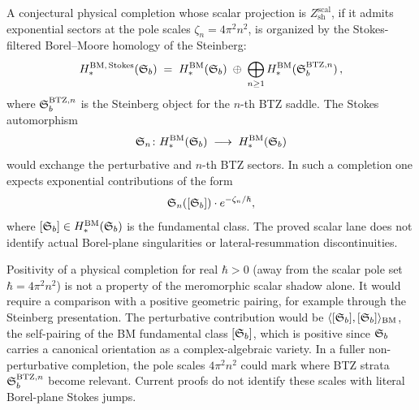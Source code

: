 \begin{conjecture}
A conjectural physical completion whose scalar projection is
$Z_{\mathrm{sh}}^{\mathrm{scal}}$, if it admits exponential sectors at
the pole scales $\zeta_n = 4\pi^2 n^2$, is organized by the
Stokes-filtered Borel--Moore homology of the Steinberg:
\begin{equation}%
H_*^{\mathrm{BM},\,\mathrm{Stokes}}(\SteinbergB) \;=\; H_*^{\mathrm{BM}}(\SteinbergB) \;\oplus\; \bigoplus_{n \geq 1} H_*^{\mathrm{BM}}(\SteinbergB^{\mathrm{BTZ},n})\,,
\end{equation}
where $\mathfrak{S}_b^{\mathrm{BTZ},n}$ is the Steinberg object for the $n$-th BTZ saddle. The Stokes automorphism
\[
\mathfrak{S}_n \colon H_*^{\mathrm{BM}}(\mathfrak{S}_b) \;\longrightarrow\; H_*^{\mathrm{BM}}(\mathfrak{S}_b)
\]
would exchange the perturbative and $n$-th BTZ sectors. In such a
completion one expects exponential contributions of the form
\[
\mathfrak{S}_n([\mathfrak{S}_b]) \cdot e^{-\zeta_n / \hbar},
\]
where $[\mathfrak{S}_b] \in H_*^{\mathrm{BM}}(\mathfrak{S}_b)$ is the
fundamental class. The proved scalar lane does not identify actual
Borel-plane singularities or lateral-resummation discontinuities.
\end{conjecture}

\begin{remark}
Positivity of a physical completion for real $\hbar > 0$ (away from
the scalar pole set $\hbar = 4\pi^2 n^2$) is not a property of the
meromorphic scalar shadow alone. It would require a comparison with a
positive geometric pairing, for example through the Steinberg
presentation. The perturbative contribution would be
$\langle [\mathfrak{S}_b], [\mathfrak{S}_b] \rangle_{\mathrm{BM}}$, the
self-pairing of the BM fundamental class $[\mathfrak{S}_b]$, which is
positive since $\mathfrak{S}_b$ carries a canonical orientation as a
complex-algebraic variety. In a fuller non-perturbative completion, the
pole scales $4\pi^2 n^2$ could mark where BTZ strata
$\mathfrak{S}_b^{\mathrm{BTZ},n}$ become relevant. Current proofs do not
identify these scales with literal Borel-plane Stokes jumps.
\end{remark}

